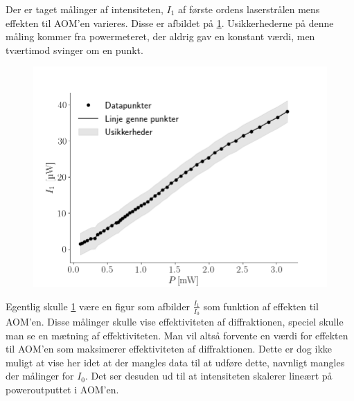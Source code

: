 \documentclass[main]{subfiles}
\begin{document}
\bigskip

Der er taget målinger af intensiteten, $I_1$ af første ordens laserstrålen mens effekten til AOM'en varieres. Disse er afbildet på \cref{fig:graf2}. Usikkerhederne på denne måling kommer fra  powermeteret, der aldrig gav en konstant værdi, men tværtimod svinger om en punkt. %

\begin{figure}[H]
    \centering
    \includegraphics[width=\linewidth]{tegninger/graf2.png}
    \caption{}
    \label{fig:graf2}
\end{figure}
Egentlig skulle \cref{fig:graf2} være en figur som afbilder $\frac{I_1}{I_0}$ som funktion af effekten til AOM'en. Disse målinger skulle vise effektiviteten af diffraktionen, speciel skulle man se en mætning af effektiviteten. Man vil altså forvente en værdi for effekten til AOM'en som maksimerer effektiviteten af diffraktionen. Dette er dog ikke muligt at vise her idet at der mangles data til at udføre dette, navnligt mangles der målinger for $I_0$. Det ser desuden ud til at intensiteten skalerer lineært på poweroutputtet i AOM'en.
\end{document}
